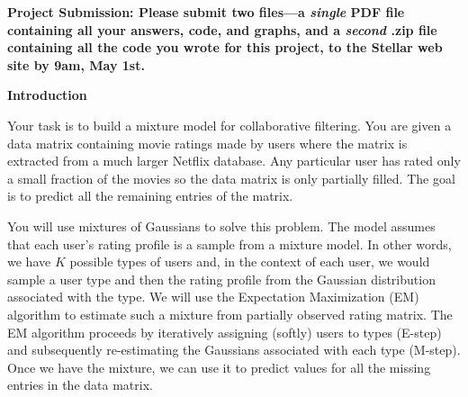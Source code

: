 

\usepackage[pdftex]{graphicx}
\usepackage{amsmath, amsthm, amssymb, amsfonts, mathtools, graphicx, enumerate}
\usepackage{times}
\usepackage{booktabs}
\usepackage{url}
\usepackage{enumerate}
\usepackage{enumitem}

\usepackage[normalem]{ulem} %
\usepackage{xcolor}

\setlength{\parindent}{0pt}
\setlength{\parskip}{1ex}

\newcommand{\answer}[1]{{\mbox{}\color{red}{#1}}}
\newcommand{\emptycheck}{\text{(\hspace{-.75ex}(\hspace{3ex})\hspace{-.75ex})}}
\newcommand{\checkans}[1]{\text{(\hspace{-.75ex}(\hspace{1ex}{#1}\hspace{1ex})\hspace{-.75ex})}}
\newcommand{\argmax}{{\mbox{arg}\hspace{-.1ex}}\max}

\newcommand{\note}[1]{\textcolor{red}{#1}}




{\bf Project Submission: Please submit two files---a \emph{single} PDF file containing all your answers, code, and graphs, and a
\emph{second} .zip file containing all the code you wrote for this
project, to
the Stellar web site by 9am, May 1st.}

\textbf{Introduction}

Your task is to build a mixture model for collaborative filtering. You are given a data matrix containing movie ratings made by users where the matrix is extracted from a much larger Netflix database. Any particular user has rated only a small fraction of the movies so the data matrix is only partially filled. The goal is to predict all the remaining entries of the matrix. 

You will use mixtures of Gaussians to solve this problem. The model assumes  that each user's rating profile is a sample from a mixture model. In other words, we have $K$ possible types of users and, in the context of each user, we would sample a user type and then the rating profile from the Gaussian distribution associated with the type. We will use the Expectation Maximization (EM) algorithm to estimate such a mixture from partially observed rating matrix. The EM algorithm proceeds by iteratively assigning (softly) users to types (E-step) and subsequently re-estimating the Gaussians associated with each type (M-step). Once we have the mixture, we can use it to predict values for all the missing entries in the data matrix.

